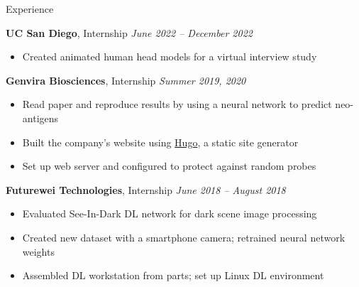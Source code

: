 	\begin{rSection}{Experience}

		{\bf UC San Diego}{, Internship} \hfill {\em June 2022 -- December 2022}
		\begin{itemize}
			\item Created animated human head models for a virtual interview study
		\end{itemize}

		{\bf Genvira Biosciences}{, Internship} \hfill {\em Summer 2019, 2020}
		\begin{itemize}
			\item Read paper and reproduce results by using a neural network to predict neo-antigens
			\item Built the company's website using \href{https://gohugo.io/}{Hugo}, a static site generator
			\item Set up web server and configured to protect against random probes
		\end{itemize}

		{\bf Futurewei Technologies}{, Internship} \hfill {\em June 2018 -- August 2018}
		\begin{itemize}
			\item Evaluated See-In-Dark DL network for dark scene image processing
			\item Created new dataset with a smartphone camera; retrained neural network weights
			\item Assembled DL workstation from parts; set up Linux DL environment
		\end{itemize}
	\end{rSection}
	
